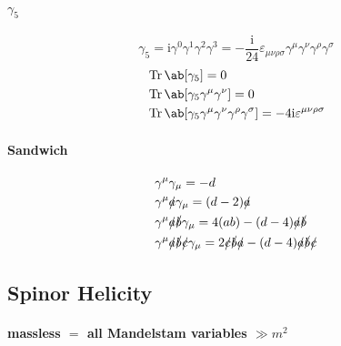 \documentclass{article}
\newcommand{\gammafive}{\gamma_5}
\newcommand{\gammamu}{\gamma^{\mu}}
\newcommand{\gammanu}{\gamma^{\nu}}
\newcommand{\gammarho}{\gamma^{\rho}}
\newcommand{\gammasigma}{\gamma^{\sigma}}
\newcommand{\rmi}{\mathrm{i}}
\newcommand{\slasheda}{\slashed{a}}
\newcommand{\slashedb}{\slashed{b}}
\newcommand{\slashedc}{\slashed{c}}
\begin{document}
\paragraph{$\gammafive$}

\[ \gammafive = \rmi \gamma^0 \gamma^1 \gamma^2 \gamma^3 = - \frac{\rmi}{24} \varepsilon_{\mu\nu\rho\sigma} \gammamu \gammanu \gammarho \gammasigma \]
\begin{align*}
     & \Tr\ab[\gammafive] = 0                                                                               \\
     & \Tr\ab[\gammafive \gammamu \gammanu] = 0                                                             \\
     & \Tr\ab[\gammafive \gammamu \gammanu \gammarho \gammasigma] = - 4 \rmi \varepsilon^{\mu\nu\rho\sigma}
\end{align*}

\paragraph{Sandwich}

\begin{align*}
     & \gammamu \gamma_{\mu} = - d                                                                                                   \\
     & \gammamu \slasheda \gamma_{\mu} = (d - 2) \slasheda                                                                           \\
     & \gammamu \slasheda \slashedb \gamma_{\mu} = 4 (a b) - (d - 4) \slasheda \slashedb                                             \\
     & \gammamu \slasheda \slashedb \slashedc \gamma_{\mu} = 2 \slashedc \slashedb \slasheda - (d - 4) \slasheda \slashedb \slashedc \\
\end{align*}

\subsection{Spinor Helicity}

\paragraph{massless $=$ all Mandelstam variables $\gg m^2$}
\end{document}
